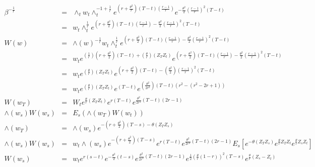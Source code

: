 \documentclass[]{article}
\begin{document}
\begin{eqnarray*}
\beta ^{-\frac{1}{r}} &=& \wedge _t w_t \wedge_t ^{-1 + \frac{1}{r}} e^{\left( r + \frac{\theta ^2}{r} \right) \left( T-t \right)\left( \frac{r-1}{r} \right)} e^{-\frac{\theta ^2}{2} \left(\frac{r-1}{r}\right)^2 \left(T-t\right)}\\
&=& w_t \wedge _t^{\frac{1}{r}} e^{\left(r+\frac{\theta ^2}{2}\right)\left( T-t \right)\left( \frac{r-1}{r} \right) - \frac{\theta ^2}{2} \left( \frac{r-1}{r} \right)^2 \left( T-t \right)}\\
W(w) &=& \wedge (w)^{-\frac{1}{r}} w_t \wedge _t^{\frac{1}{r}} e^{\left(r+\frac{\theta ^2}{2}\right)\left( T-t \right)\left( \frac{r-1}{r} \right) - \frac{\theta ^2}{2} \left( \frac{r-1}{r} \right)^2 \left( T-t \right)}\\
&=& w_t e^{\left( \frac{1}{r} \right) \left( r+\frac{\theta ^2}{2} \right) \left( T-t\right) + \left( \frac{\theta}{r} \right) \left( Z_T Z_t\right)} e^{\left(r+\frac{\theta ^2}{2}\right)\left( T-t \right)\left( \frac{r-1}{r} \right) - \frac{\theta ^2}{2} \left( \frac{r-1}{r} \right)^2 \left( T-t \right)}\\
&=& w_t e^{\left( \frac{\theta}{r} \right) \left( Z_T Z_t\right)} e^{ \left( r+\frac{\theta ^2}{2} \right) \left( T-t\right)- \left(\frac{\theta ^2}{2}\right)\left( \frac{r-1}{r} \right)^2\left( T-t \right)}\\
&=& w_t e^{\left( \frac{\theta}{r} \right) \left( Z_T Z_t\right)} e^{ \left( T-t\right)} e^{\left(\frac{\theta ^2}{2r^2}\right) \left( T-t \right) \left( r^2 - \left(r^2 - 2r + 1\right)\right)}\\
W(w_T) &=& W_t e^{\frac{\theta}{r} \left( Z_T Z_t \right)} e^{r \left( T-t\right)} e^{\frac{\theta ^2}{2r^2} \left( T-t \right)\left( 2r-1 \right)}\\
\wedge (w_s) W(w_s) &=& E_s \left( \wedge (w_T) W(w_t) \right)\\
\wedge (w_T) &=& \wedge (w_s) e^{-\left( r+\frac{\theta ^2}{2}\right)\left( T-s \right)-\theta \left( Z_T Z_s\right)}\\
\wedge (w_s) W(w_s) &=& w_t \wedge(w_s) e^{-\left( r+\frac{\theta ^2}{2}\right)\left( T-s \right)} e^{r\left( T-t  \right)} e^{\frac{\theta ^2}{2r^2}\left( T-t \right)\left( 2r-1 \right)} E_s \left[ e^{-\theta \left( Z_T Z_s\right)} e^{\frac{\theta}{r} Z_T Z_t} e^{\frac{\theta}{r} Z_s Z_t}\right]\\
W(w_s) &=& w_t e^{r\left( s-t \right)} e^{-\frac{\theta ^2}{2} \left( t-s \right)} e^{\frac{\theta ^2}{2r^2}\left( T-t \right)\left( 2r-1 \right)} e^{\frac{1}{2} \left( \frac{\theta}{r} \left( 1-r \right)\right)^2 \left( T-s \right)} e^{\frac{\theta}{r} \left( Z_s - Z_t\right)}\\

\end{eqnarray*}
\end{document}
